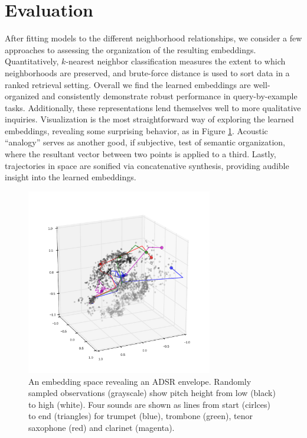 \documentclass{article}
\begin{document}
\section{Evaluation}

After fitting models to the different neighborhood relationships, we consider a few approaches to assessing the organization of the resulting embeddings.
Quantitatively, $k$-nearest neighbor classification measures the extent to which neighborhoods are preserved, and brute-force distance is used to sort data in a ranked retrieval setting.
Overall we find the learned embeddings are well-organized and consistently demonstrate robust performance in query-by-example tasks.
Additionally, these representations lend themselves well to more qualitative inquiries.
Visualization is the most straightforward way of exploring the learned embeddings, revealing some surprising behavior, as in Figure \ref{fig:asdr}.
Acoustic ``analogy'' serves as another good, if subjective, test of semantic organization, where the resultant vector between two points is applied to a third.
Lastly, trajectories in space are sonified via concatenative synthesis, providing audible insight into the learned embeddings.



\begin{figure}[!t]
\vskip -0.25in
\begin{center}
\centerline{\includegraphics[width=3.2in]{inst-pitch-d2_adsr.pdf}}
\vskip -0.2in
\caption{An embedding space revealing an ADSR envelope. Randomly sampled observations (grayscale) show pitch height from low (black) to high (white). Four sounds are shown as lines from start (cirlces) to end (triangles) for trumpet (blue), trombone (green), tenor saxophone (red) and clarinet (magenta).}
\label{fig:asdr}
\end{center}
\vskip -0.25in
\end{figure}
\end{document}
